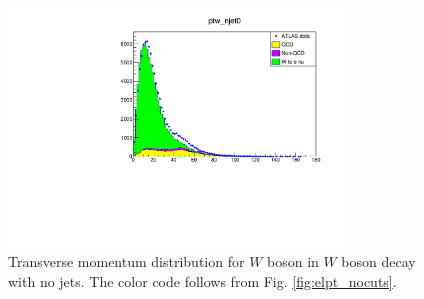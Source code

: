 \documentclass[a4paper]{report}
\numberwithin{equation}{section}
\begin{document}
\begin{figure}[htpb]
    \centering
    \includegraphics[width=0.8\textwidth]{ptw_qcd30_njet0.pdf}
    \caption{Transverse momentum distribution for $W$ boson in $W$ boson decay with no jets. The color code follows from Fig. \ref{fig:elpt_nocuts}.}
    \label{fig:ptw_njet0}
\end{figure}
\end{document}
